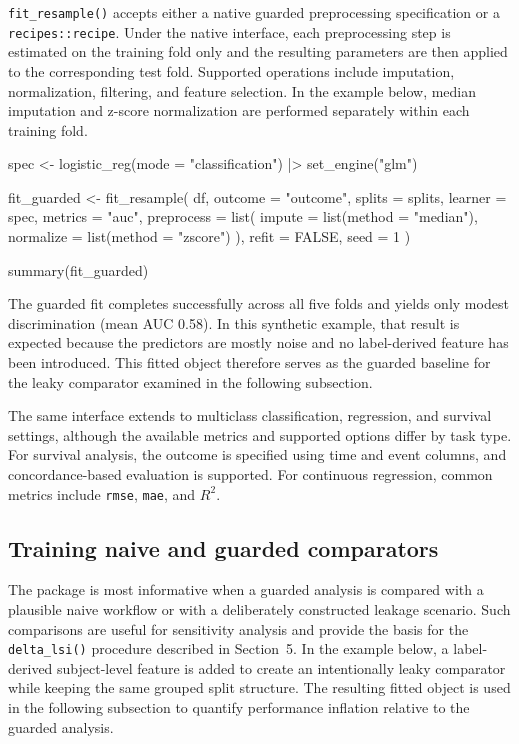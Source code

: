 \documentclass[article]{jss}
\begin{document}
\texttt{fit\_resample()} accepts either a native guarded preprocessing specification or a \texttt{recipes::recipe}. Under the native interface, each preprocessing step is estimated on the training fold only and the resulting parameters are then applied to the corresponding test fold. Supported operations include imputation, normalization, filtering, and feature selection. In the example below, median imputation and z-score normalization are performed separately within each training fold.

\begin{CodeInput}
spec <- logistic_reg(mode = "classification") |>
  set_engine("glm")

fit_guarded <- fit_resample(
  df,
  outcome = "outcome",
  splits = splits,
  learner = spec,
  metrics = "auc",
  preprocess = list(
    impute = list(method = "median"),
    normalize = list(method = "zscore")
  ),
  refit = FALSE,
  seed = 1
)

summary(fit_guarded)
\end{CodeInput}


\noindent
The guarded fit completes successfully across all five folds and yields only modest discrimination (mean AUC 0.58). In this synthetic example, that result is expected because the predictors are mostly noise and no label-derived feature has been introduced. This fitted object therefore serves as the guarded baseline for the leaky comparator examined in the following subsection.

The same interface extends to multiclass classification, regression, and survival settings, although the available metrics and supported options differ by task type. For survival analysis, the outcome is specified using time and event columns, and concordance-based evaluation is supported. For continuous regression, common metrics include \texttt{rmse}, \texttt{mae}, and $R^2$.

\subsection{Training naive and guarded comparators}

The package is most informative when a guarded analysis is compared with a plausible naive workflow or with a deliberately constructed leakage scenario. Such comparisons are useful for sensitivity analysis and provide the basis for the \texttt{delta\_lsi()} procedure described in Section~5. In the example below, a label-derived subject-level feature is added to create an intentionally leaky comparator while keeping the same grouped split structure. The resulting fitted object is used in the following subsection to quantify performance inflation relative to the guarded analysis.
\end{document}
